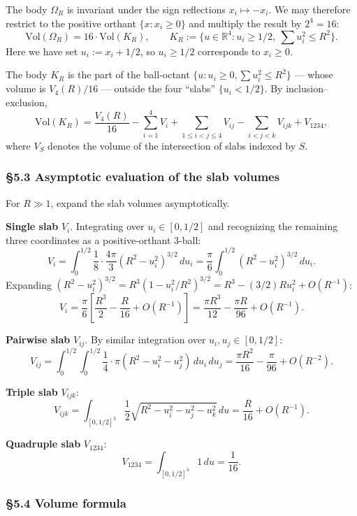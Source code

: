 \documentclass[a4paper,11pt]{article}
\theoremstyle{definition}
\begin{document}
The body \(\Omega_R\) is invariant under the sign reflections
\(x_i \mapsto -x_i\). We may therefore restrict to the positive orthant
\(\{x : x_i \ge 0\}\) and multiply the result by \(2^4 = 16\):
\[\mathrm{Vol}(\Omega_R) = 16 \cdot \mathrm{Vol}(K_R), \qquad K_R := \{u \in \mathbb{R}^4 : u_i \ge 1/2,\ \textstyle\sum u_i^2 \le R^2\}.\]
Here we have set \(u_i := x_i + 1/2\), so \(u_i \ge 1/2\) corresponds to
\(x_i \ge 0\).

The body \(K_R\) is the part of the ball-octant
\(\{u : u_i \ge 0, \sum u_i^2 \le R^2\}\) --- whose volume is
\(V_4(R)/16\) --- outside the four ``slabs'' \(\{u_i < 1/2\}\). By
inclusion--exclusion,
\[\mathrm{Vol}(K_R) = \frac{V_4(R)}{16} - \sum_{i=1}^{4} V_i + \sum_{1\le i<j\le 4} V_{ij} - \sum_{i<j<k} V_{ijk} + V_{1234},\]
where \(V_S\) denotes the volume of the intersection of slabs indexed by
\(S\).

\subsubsection{§5.3 Asymptotic evaluation of the slab
volumes}\label{asymptotic-evaluation-of-the-slab-volumes}

For \(R \gg 1\), expand the slab volumes asymptotically.

\textbf{Single slab} \(V_i\). Integrating over \(u_i \in [0, 1/2]\) and
recognizing the remaining three coordinates as a positive-orthant
3-ball:
\[V_i = \int_0^{1/2} \frac{1}{8} \cdot \frac{4\pi}{3} (R^2 - u_i^2)^{3/2}\, du_i = \frac{\pi}{6} \int_0^{1/2} (R^2 - u_i^2)^{3/2}\, du_i.\]
Expanding
\((R^2 - u_i^2)^{3/2} = R^3 (1 - u_i^2/R^2)^{3/2} = R^3 - (3/2) R u_i^2 + O(R^{-1})\):
\[V_i = \frac{\pi}{6} \left[\frac{R^3}{2} - \frac{R}{16} + O(R^{-1})\right] = \frac{\pi R^3}{12} - \frac{\pi R}{96} + O(R^{-1}).\]

\textbf{Pairwise slab} \(V_{ij}\). By similar integration over
\(u_i, u_j \in [0,1/2]\):
\[V_{ij} = \int_0^{1/2}\int_0^{1/2} \frac{1}{4} \cdot \pi (R^2 - u_i^2 - u_j^2)\, du_i\, du_j = \frac{\pi R^2}{16} - \frac{\pi}{96} + O(R^{-2}).\]

\textbf{Triple slab} \(V_{ijk}\):
\[V_{ijk} = \int_{[0,1/2]^3} \frac{1}{2} \sqrt{R^2 - u_i^2 - u_j^2 - u_k^2}\, du = \frac{R}{16} + O(R^{-1}).\]

\textbf{Quadruple slab} \(V_{1234}\):
\[V_{1234} = \int_{[0,1/2]^4} 1\, du = \frac{1}{16}.\]

\subsubsection{§5.4 Volume formula}\label{volume-formula}
\end{document}
